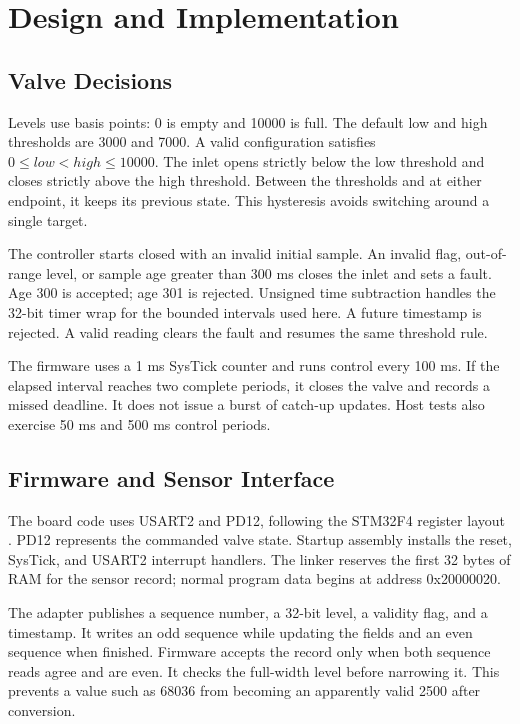 \documentclass[conference]{IEEEtran}
\begin{document}
\section{Design and Implementation}
\subsection{Valve Decisions}
Levels use basis points: 0 is empty and 10000 is full. The default low and high thresholds are 3000 and 7000. A valid configuration satisfies $0\leq low<high\leq10000$. The inlet opens strictly below the low threshold and closes strictly above the high threshold. Between the thresholds and at either endpoint, it keeps its previous state. This hysteresis avoids switching around a single target.

The controller starts closed with an invalid initial sample. An invalid flag, out-of-range level, or sample age greater than 300 ms closes the inlet and sets a fault. Age 300 is accepted; age 301 is rejected. Unsigned time subtraction handles the 32-bit timer wrap for the bounded intervals used here. A future timestamp is rejected. A valid reading clears the fault and resumes the same threshold rule.

The firmware uses a 1 ms SysTick counter and runs control every 100 ms. If the elapsed interval reaches two complete periods, it closes the valve and records a missed deadline. It does not issue a burst of catch-up updates. Host tests also exercise 50 ms and 500 ms control periods.

\subsection{Firmware and Sensor Interface}
The board code uses USART2 and PD12, following the STM32F4 register layout \cite{stm32}. PD12 represents the commanded valve state. Startup assembly installs the reset, SysTick, and USART2 interrupt handlers. The linker reserves the first 32 bytes of RAM for the sensor record; normal program data begins at address 0x20000020.

The adapter publishes a sequence number, a 32-bit level, a validity flag, and a timestamp. It writes an odd sequence while updating the fields and an even sequence when finished. Firmware accepts the record only when both sequence reads agree and are even. It checks the full-width level before narrowing it. This prevents a value such as 68036 from becoming an apparently valid 2500 after conversion.
\end{document}
